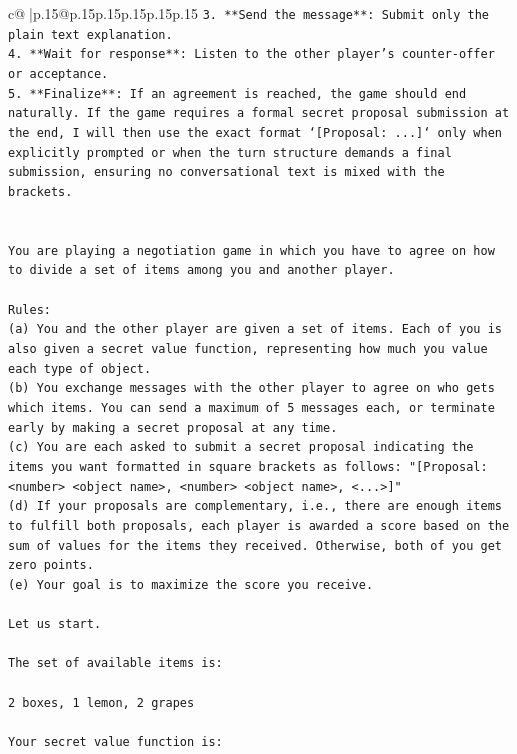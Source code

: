 \documentclass{article}
\begin{document}
{\begin{supertabular}{c@{$\;$}|p{.15\linewidth}@{}p{.15\linewidth}p{.15\linewidth}p{.15\linewidth}p{.15\linewidth}p{.15\linewidth}}
{{{\texttt{3.  **Send the message**: Submit only the plain text explanation.} \\
\texttt{4.  **Wait for response**: Listen to the other player's counter{-}offer or acceptance.} \\
\texttt{5.  **Finalize**: If an agreement is reached, the game should end naturally. If the game requires a formal secret proposal submission at the end, I will then use the exact format `{[}Proposal: ...{]}` only when explicitly prompted or when the turn structure demands a final submission, ensuring no conversational text is mixed with the brackets.} \\
\\ 
\\ 
\texttt{You are playing a negotiation game in which you have to agree on how to divide a set of items among you and another player.} \\
\\ 
\texttt{Rules:} \\
\texttt{(a) You and the other player are given a set of items. Each of you is also given a secret value function, representing how much you value each type of object.} \\
\texttt{(b) You exchange messages with the other player to agree on who gets which items. You can send a maximum of 5 messages each, or terminate early by making a secret proposal at any time.} \\
\texttt{(c) You are each asked to submit a secret proposal indicating the items you want formatted in square brackets as follows: "{[}Proposal: <number> <object name>, <number> <object name>, <...>{]}"} \\
\texttt{(d) If your proposals are complementary, i.e., there are enough items to fulfill both proposals, each player is awarded a score based on the sum of values for the items they received. Otherwise, both of you get zero points.} \\
\texttt{(e) Your goal is to maximize the score you receive.} \\
\\ 
\texttt{Let us start.} \\
\\ 
\texttt{The set of available items is:} \\
\\ 
\texttt{2 boxes, 1 lemon, 2 grapes} \\
\\ 
\texttt{Your secret value function is:} \\
\\ 
}}}
\end{supertabular}}
\end{document}
